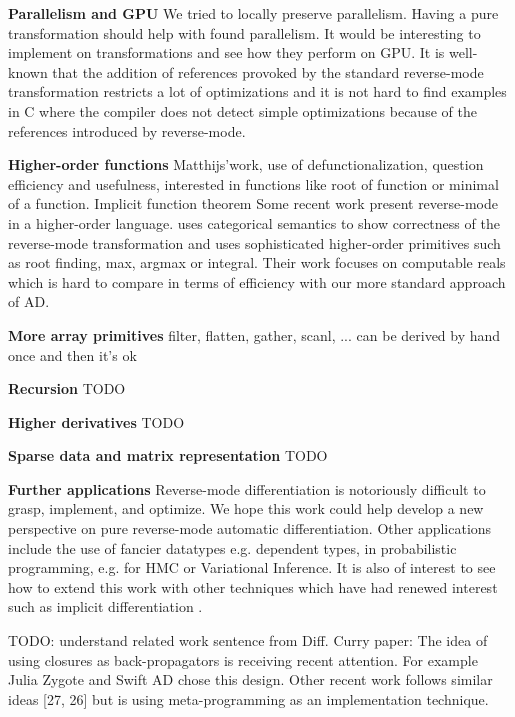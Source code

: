 \noindent \textbf{Parallelism and GPU}
We tried to locally preserve parallelism. Having a pure transformation should help with found parallelism. 
It would be interesting to implement on transformations and see how they perform on GPU.
It is well-known that the addition of references provoked by the standard reverse-mode transformation
restricts a lot of optimizations and it is not hard to find examples in C where the compiler does not detect simple optimizations 
because of the references introduced by reverse-mode.


\noindent \textbf{Higher-order functions}
Matthijs'work, use of defunctionalization, question efficiency and usefulness, 
interested in functions like root of function or minimal of a function. Implicit function theorem
Some recent work \cite{vakar2020reverse,sherman2021} present reverse-mode in a higher-order language.
\cite{vakar2020reverse} uses categorical semantics to show correctness of the reverse-mode transformation 
and \cite{sherman2021} uses sophisticated higher-order primitives such as root finding, max, argmax or integral. 
Their work focuses on computable reals which is hard to compare in terms of efficiency 
with our more standard approach of AD.

\noindent \textbf{More array primitives}
filter, flatten, gather, scanl, ...
can be derived by hand once and then it's ok

\noindent \textbf{Recursion}
TODO

\noindent \textbf{Higher derivatives}
TODO

\noindent \textbf{Sparse data and matrix representation}
TODO

\noindent \textbf{Further applications}
Reverse-mode differentiation is notoriously difficult to grasp, implement, and optimize.
We hope this work could help develop a new perspective on pure reverse-mode automatic differentiation.
Other applications include the use of fancier datatypes e.g. dependent types, 
in probabilistic programming, e.g. for HMC or Variational Inference. 
It is also of interest to see how to extend this work with other techniques which 
have had renewed interest such as implicit differentiation \cite{blondel2021efficient,lorraine2020optimizing}.


TODO: understand related work sentence from Diff. Curry paper: The idea of using closures as back-propagators is receiving recent attention. 
    For example Julia Zygote \cite{innes2019zygote} and Swift AD \cite{wei2018first} chose this design. 
    Other recent work follows similar ideas [27, 26] but is using meta-programming as an implementation technique.

